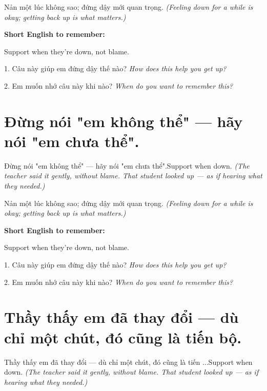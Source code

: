 \begin{baihoc}
Nản một lúc không sao; đứng dậy mới quan trọng.
\textit{(Feeling down for a while is okay; getting back up is what matters.)}
\end{baihoc}

\begin{ghinhoanh}
\textbf{Short English to remember:}

Support when they're down, not blame.

\end{ghinhoanh}

\begin{tuhocnhanh}
1. Câu này giúp em đứng dậy thế nào? \textit{How does this help you get up?}

2. Em muốn nhớ câu này khi nào? \textit{When do you want to remember this?}
\end{tuhocnhanh}
\ngancach


\section{Đừng nói "em không thể" — hãy nói "em chưa thể".}
\begin{truyen}{Đừng nói "em không thể" — hãy nói "em chưa thể".}{Support when down.}
\textit{(The teacher said it gently, without blame. That student looked up — as if hearing what they needed.)}
\end{truyen}

\begin{baihoc}
Nản một lúc không sao; đứng dậy mới quan trọng.
\textit{(Feeling down for a while is okay; getting back up is what matters.)}
\end{baihoc}

\begin{ghinhoanh}
\textbf{Short English to remember:}

Support when they're down, not blame.

\end{ghinhoanh}

\begin{tuhocnhanh}
1. Câu này giúp em đứng dậy thế nào? \textit{How does this help you get up?}

2. Em muốn nhớ câu này khi nào? \textit{When do you want to remember this?}
\end{tuhocnhanh}
\ngancach


\section{Thầy thấy em đã thay đổi — dù chỉ một chút, đó cũng là tiến bộ.}
\begin{truyen}{Thầy thấy em đã thay đổi — dù chỉ một chút, đó cũng là tiến ...}{Support when down.}
\textit{(The teacher said it gently, without blame. That student looked up — as if hearing what they needed.)}
\end{truyen}

